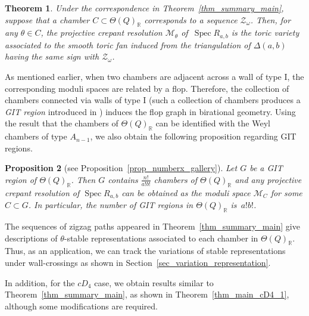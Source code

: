 \documentclass[pdftex]{sigma}
\numberwithin{equation}{section}
\newtheorem{Theorem}{Theorem}[section]
\newtheorem{Proposition}[Theorem]{Proposition}
\theoremstyle{definition}
\newcommand{\RR}{\mathbb{R}}
\newcommand{\calM}{\mathcal{M}}
\newcommand{\calZ}{\mathcal{Z}}
\newcommand{\Spec}{\operatorname{Spec}}
\newcommand{\permII}{\omega}
\begin{document}
\begin{Theorem}
Under the correspondence in Theorem~{\rm \ref{thm_summary_main}}, suppose that a chamber $C\subset\Theta(Q)_\RR$ corresponds to a sequence $\calZ_\permII$.
Then, for any $\theta\in C$, the projective crepant resolution $\calM_\theta$ of~$\Spec R_{a,b}$
is the toric variety associated to the smooth toric fan induced from the triangulation of $\Delta(a,b)$ having the same sign with $\calZ_\permII$.
\end{Theorem}

As mentioned earlier, when two chambers are adjacent across a wall of type I, the corresponding moduli spaces are related by a flop.
Therefore, the collection of chambers connected via walls of type I (such a collection of chambers produces a \emph{GIT region} introduced in \cite{BCS_GIT}) induces the flop graph in birational geometry.
Using the result that the chambers of $\Theta(Q)_\RR$ can be identified with the Weyl chambers of type $A_{n-1}$, we also obtain the following proposition regarding GIT regions.

\begin{Proposition}[{see Proposition~\ref{prop_numberx_gallery}}]
Let $G$ be a GIT region of $\Theta(Q)_\RR$. Then $G$ contains $\frac{n!}{a! b!}$ chambers of $\Theta(Q)_\RR$ and
any projective crepant resolution of $\Spec R_{a,b}$ can be obtained as the moduli space $\calM_C$ for some $C\subset G$.
In particular, the number of GIT regions in $\Theta(Q)_\RR$ is~$a ! b!$.
\end{Proposition}

The sequences of zigzag paths appeared in Theorem~\ref{thm_summary_main} give descriptions of $\theta$-stable representations
associated to each chamber in $\Theta(Q)_\RR$.
Thus, as an application, we can track the variations of stable representations under wall-crossings
as shown in Section~\ref{sec_variation_representation}.

In addition, for the $cD_4$ case, we obtain results similar to Theorem~\ref{thm_summary_main}, as shown in Theorem~\ref{thm_main_cD4_1}, although some modifications are required.
\end{document}
